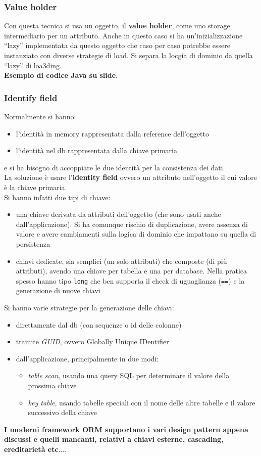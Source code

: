 \documentclass[a4paper,12pt, oneside]{book}
\begin{document}
\subsubsection{Value holder}
Con questa tecnica si usa un oggetto, il \textbf{value holder}, come uno storage
intermediario per un attributo. Anche in questo caso si ha un'inizializzazione
``lazy'' implementata da questo oggetto che caso per caso potrebbe essere
instanziato con diverse strategie di load. Si separa la locgia di dominio da
quella ``lazy'' di loa3ding.\\
\textbf{Esempio di codice Java su slide.}

\subsubsection{Identify field}
Normalmente si hanno:
\begin{itemize}
  \item l'identità in memory rappresentata dalla reference dell'oggetto
  \item l'identità nel db rappresentata dalla chiave primaria
\end{itemize}
e si ha bisogno di accoppiare le due identità per la consistenza dei dati.\\
La soluzione è usare l'\textbf{identity field} ovvero un attributo nell'oggetto
il cui valore è la chiave primaria.\\
Si hanno infatti due tipi di chiave:
\begin{itemize}
  \item una chiave derivata da attributi dell'oggetto (che sono usati anche
  dall'applicazione). Si ha comunque rischio di duplicazione, avere assenza di
  valore e avere cambiamenti sulla logica di dominio che impattano su quella di
  persistenza  
  \item chiavi dedicate, sia semplici (un solo attributi) che composte (di più
  attributi), avendo una chiave per tabella e una per database. Nella pratica
  spesso hanno tipo \texttt{long} che ben supporta il check di uguaglianza
  (\texttt{==}) e la generazione di nuove chiavi
\end{itemize}
Si hanno varie strategie per la generazione delle chiavi:
\begin{itemize}
  \item direttamente dal db (con sequenze o id delle colonne)
  \item tramite \textit{GUID}, ovvero Globally Unique IDentifier
  \item dall'applicazione, principalmente in due modi:
  \begin{itemize}
    \item \textit{table scan}, usando una query SQL per determinare il valore
    della prossima chiave
    \item \textit{key table}, usando tabelle speciali con il nome delle altre
    tabelle e il valore successivo della chiave
  \end{itemize}
\end{itemize}
\textbf{I moderni framework ORM supportano i vari design pattern appena discussi
e quelli mancanti, relativi a chiavi esterne, cascading, ereditarietà
etc$\ldots$}.
\end{document}
